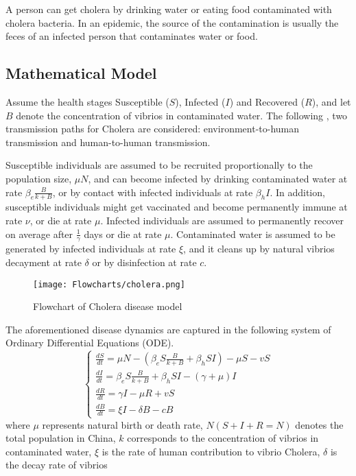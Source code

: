 \documentclass{book}\usepackage[]{graphicx}\usepackage[]{color}
\begin{document}
A person can get cholera by drinking water or eating food contaminated with cholera bacteria. In an epidemic, the source of the contamination is usually the feces of an infected person that contaminates water or food.

\subsection*{Mathematical Model}
Assume the health stages Susceptible ($S$), Infected ($I$) and Recovered ($R$), and let $B$ denote the concentration of vibrios in contaminated water. The following \cite{sun2017transmission}, two transmission paths for Cholera are considered: environment-to-human transmission and human-to-human transmission.

Susceptible individuals are assumed to be recruited proportionally to the population size, $\mu N$, and can become infected by drinking contaminated water at rate $\beta_{e}\frac{B}{k+B}$, or by contact with infected individuals at rate $\beta_{h}I$. In addition, susceptible individuals might get vaccinated and become permanently immune at rate $\nu$, or die at rate $\mu$.
Infected individuals are assumed to permanently recover on average after $\frac{1}{\gamma}$ days or die at rate $\mu$.
Contaminated water is assumed to be generated by infected individuals at rate $\xi$, and it cleans up by natural vibrios decayment at rate $\delta$ or by disinfection at rate $c$.

\begin{figure}
    \centering
    \texttt{[image: Flowcharts/cholera.png]}
    \caption{Flowchart of Cholera disease model}
    \label{fig:cholera_flow}
\end{figure}

The aforementioned disease dynamics are captured in the following system of Ordinary Differential Equations (ODE).
%
\begin{equation} \label{eq:cholera_model}
\left\{\begin{array}{l}
\frac{d S}{d t}=\mu N-\left(\beta_{e} S \frac{B}{k+B}+\beta_{h} S I\right)-\mu S-v S \\
\frac{d I}{d t}=\beta_{e} S \frac{B}{k+B}+\beta_{h} S I-(\gamma+\mu) I \\
\frac{d R}{d t}=\gamma I-\mu R+v S \\
\frac{d B}{d t}=\xi I-\delta B-c B
\end{array}\right.
\end{equation}
%
where $\mu$ represents natural birth or death rate, $N(S+I+R=N)$ denotes the total population in China, $k$ corresponds to the concentration of vibrios in contaminated water, $\xi$ is the rate of human contribution to vibrio Cholera, $\delta$ is the decay rate of vibrios 
\end{document}
